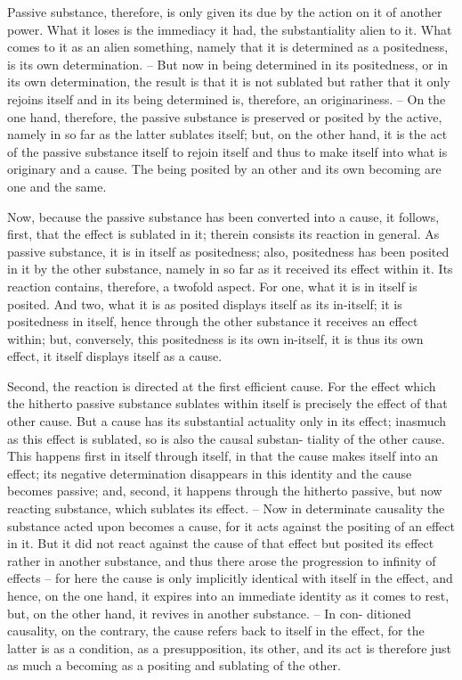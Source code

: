 Passive substance, therefore, is only given its due by the action on it of
another power. What it loses is the immediacy it had, the substantiality alien
to it. What comes to it as an alien something, namely that it is determined
as a positedness, is its own determination. – But now in being determined
in its positedness, or in its own determination, the result is that it is not
sublated but rather that it only rejoins itself and in its being determined
is, therefore, an originariness. – On the one hand, therefore, the passive
substance is preserved or posited by the active, namely in so far as the latter
sublates itself; but, on the other hand, it is the act of the passive substance
itself to rejoin itself and thus to make itself into what is originary and a
cause. The being posited by an other and its own becoming are one and the
same.

Now, because the passive substance has been converted into a cause, it
follows, first, that the effect is sublated in it; therein consists its reaction in
general. As passive substance, it is in itself as positedness; also, positedness
has been posited in it by the other substance, namely in so far as it received
its effect within it. Its reaction contains, therefore, a twofold aspect. For
one, what it is in itself is posited. And two, what it is as posited displays itself
as its in-itself; it is positedness in itself, hence through the other substance it
receives an effect within; but, conversely, this positedness is its own in-itself,
it is thus its own effect, it itself displays itself as a cause.

Second, the reaction is directed at the first efficient cause. For the effect
which the hitherto passive substance sublates within itself is precisely the
effect of that other cause. But a cause has its substantial actuality only in
its effect; inasmuch as this effect is sublated, so is also the causal substan-
tiality of the other cause. This happens first in itself through itself, in that
the cause makes itself into an effect; its negative determination disappears
in this identity and the cause becomes passive; and, second, it happens
through the hitherto passive, but now reacting substance, which sublates its
effect. – Now in determinate causality the substance acted upon becomes
a cause, for it acts against the positing of an effect in it. But it did not
react against the cause of that effect but posited its effect rather in another
substance, and thus there arose the progression to infinity of effects –
for here the cause is only implicitly identical with itself in the effect, and
hence, on the one hand, it expires into an immediate identity as it comes
to rest, but, on the other hand, it revives in another substance. – In con-
ditioned causality, on the contrary, the cause refers back to itself in the
effect, for the latter is as a condition, as a presupposition, its other, and its
act is therefore just as much a becoming as a positing and sublating of the
other.

